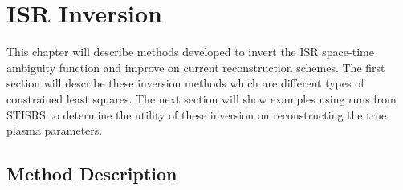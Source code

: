 \chapter{ISR Inversion}
\label{chapter:inversion}
\thispagestyle{myheadings}

\graphicspath{{5_Inversions/Figures/}}

This chapter will describe methods developed to invert the ISR space-time ambiguity function and improve on current reconstruction schemes. The first section will describe these inversion methods which are different types of constrained least squares. The next section will show examples using runs from STISRS to determine the utility of these inversion on reconstructing the true plasma parameters.

\section{Method Description}